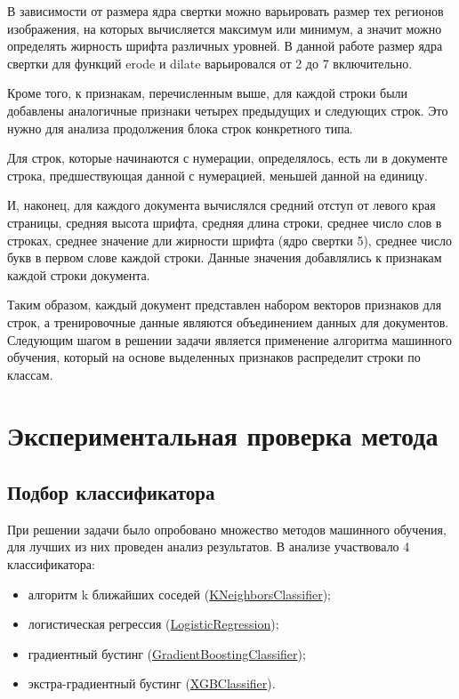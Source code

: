 \documentclass{ProcISPRAS}
\begin{document}
В зависимости от размера ядра свертки можно варьировать размер тех регионов изображения, на которых вычисляется максимум или минимум, а значит можно определять жирность шрифта различных уровней. В данной работе размер ядра свертки для функций erode и dilate варьировался от 2 до 7 включительно.

Кроме того, к признакам, перечисленным выше, для каждой строки были добавлены аналогичные признаки четырех предыдущих и следующих строк. Это нужно для анализа продолжения блока строк конкретного типа.

Для строк, которые начинаются с нумерации, определялось, есть ли в документе строка, предшествующая данной с нумерацией, меньшей данной на единицу.

И, наконец, для каждого документа вычислялся средний отступ от левого края страницы, средняя высота шрифта, средняя длина строки, среднее число слов в строках, среднее значение дли жирности шрифта (ядро свертки 5), среднее число букв в первом слове каждой строки. Данные значения добавлялись к признакам каждой строки документа.

Таким образом, каждый документ представлен набором векторов признаков для строк, а тренировочные данные являются объединением данных для документов.
Следующим шагом в решении задачи является применение алгоритма машинного обучения, который на основе выделенных признаков распределит строки по классам.

\section{Экспериментальная проверка метода}

\subsection{Подбор классификатора}

При решении задачи было опробовано множество методов машинного обучения, для лучших из них проведен анализ результатов. В анализе участвовало 4 классификатора:

\begin{itemize}

  \item алгоритм k ближайших соседей (\href{https://scikit-learn.org/stable/modules/generated/sklearn.neighbors.KNeighborsClassifier.html}{KNeighborsClassifier});
  \item логистическая регрессия (\href{https://scikit-learn.org/stable/modules/generated/sklearn.linear_model.LogisticRegression.html}{LogisticRegression});
  \item градиентный бустинг (\href{https://scikit-learn.org/stable/modules/generated/sklearn.ensemble.GradientBoostingClassifier.html}{GradientBoostingClassifier});
  \item экстра-градиентный бустинг (\href{https://xgboost.readthedocs.io/en/latest/}{XGBClassifier}).

\end{itemize}
\end{document}
